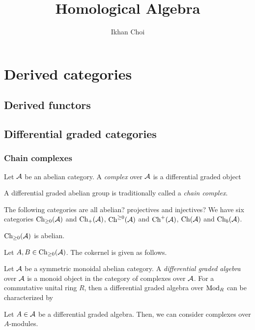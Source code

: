 \documentclass{../../large}
\begin{document}
\title{Homological Algebra}
\author{Ikhan Choi}
\maketitle
\tableofcontents







\part{Derived categories}

\chapter{Derived functors}



\chapter{Differential graded categories}

\section{Chain complexes}



\begin{prb}
Let $\mathcal{A}$ be an abelian category.
A \emph{complex} over $\mathcal{A}$ is a differential graded object


A differential graded abelian group is traditionally called a \emph{chain complex}.

The following categories are all abelian? projectives and injectives?
We have six categories
$\mathrm{Ch}_{\ge0}(\mathcal{A})$ and $\mathrm{Ch}_+(\mathcal{A})$, $\mathrm{Ch}^{\ge0}(\mathcal{A})$ and $\mathrm{Ch}^+(\mathcal{A})$, $\mathrm{Ch}(\mathcal{A})$ and $\mathrm{Ch}_b(\mathcal{A})$.

\begin{parts}
\item $\mathrm{Ch}_{\ge0}(\mathcal{A})$ is abelian.
\end{parts}
\end{prb}

\begin{pf}
Let $A,B\in\mathrm{Ch}_{\ge0}(\mathcal{A})$.
The cokernel is given as follows.
\end{pf}




\begin{prb}
Let $\mathcal{A}$ be a symmetric monoidal abelian category.
A \emph{differential graded algebra} over $\mathcal{A}$ is a monoid object in the category of complexes over $\mathcal{A}$.
For a commutative unital ring $R$, then a differential graded algebra over $\operatorname{Mod}_R$ can be characterized by 

Let $A\in\mathcal{A}$ be a differential graded algebra.
Then, we can consider complexes over $A$-modules.
\end{prb}
\end{document}
